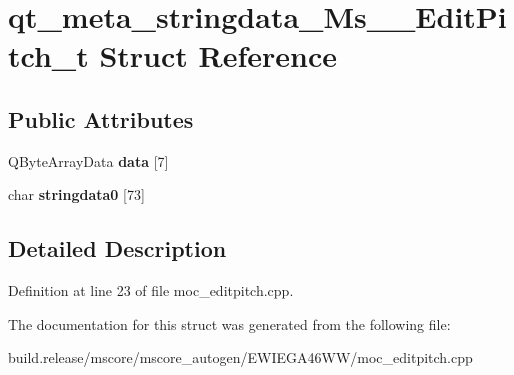 \hypertarget{structqt__meta__stringdata___ms_____edit_pitch__t}{}\section{qt\+\_\+meta\+\_\+stringdata\+\_\+\+Ms\+\_\+\+\_\+\+Edit\+Pitch\+\_\+t Struct Reference}
\label{structqt__meta__stringdata___ms_____edit_pitch__t}
\subsection*{Public Attributes}
\begin{DoxyCompactItemize}
\item 
\mbox{\label{structqt__meta__stringdata___ms_____edit_pitch__t_a0c4474fcc223f55b79d536ee2f4da6c5}} 
Q\+Byte\+Array\+Data {\bfseries data} \mbox{[}7\mbox{]}
\item 
\mbox{\label{structqt__meta__stringdata___ms_____edit_pitch__t_ab46510d9a18520dbc3864c2bdaad0b90}} 
char {\bfseries stringdata0} \mbox{[}73\mbox{]}
\end{DoxyCompactItemize}


\subsection{Detailed Description}


Definition at line 23 of file moc\+\_\+editpitch.\+cpp.



The documentation for this struct was generated from the following file\+:\begin{DoxyCompactItemize}
\item 
build.\+release/mscore/mscore\+\_\+autogen/\+E\+W\+I\+E\+G\+A46\+W\+W/moc\+\_\+editpitch.\+cpp\end{DoxyCompactItemize}
